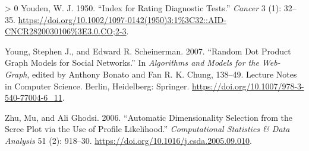 \documentclass[10pt,oneside]{article}
\newlength{\cslhangindent}
\newenvironment{CSLReferences}[3] %
 {%
  \setlength{\parindent}{0pt}
  \ifodd #1 \everypar{\setlength{\hangindent}{\cslhangindent}}\ignorespaces\fi
  \ifnum #2 > 0
  \setlength{\parskip}{#2\baselineskip}
  \fi
 }%
 {}
\begin{document}
\begin{CSLReferences}{1}{0}
\leavevmode\hypertarget{ref-Youden1950IndRat}{}%
Youden, W. J. 1950. {``Index for Rating Diagnostic Tests.''}
\emph{Cancer} 3 (1): 32--35.
\url{https://doi.org/10.1002/1097-0142(1950)3:1\%3C32::AID-CNCR2820030106\%3E3.0.CO;2-3}.

\leavevmode\hypertarget{ref-Young2007RanDot}{}%
Young, Stephen J., and Edward R. Scheinerman. 2007. {``Random Dot
Product Graph Models for Social Networks.''} In \emph{Algorithms and
Models for the Web-Graph}, edited by Anthony Bonato and Fan R. K. Chung,
138--49. Lecture Notes in Computer Science. Berlin, Heidelberg:
Springer. \url{https://doi.org/10.1007/978-3-540-77004-6_11}.

\leavevmode\hypertarget{ref-Zhu2006AutDim}{}%
Zhu, Mu, and Ali Ghodsi. 2006. {``Automatic Dimensionality Selection
from the Scree Plot via the Use of Profile Likelihood.''}
\emph{Computational Statistics \& Data Analysis} 51 (2): 918--30.
\url{https://doi.org/10.1016/j.csda.2005.09.010}.

\end{CSLReferences}
\end{document}
